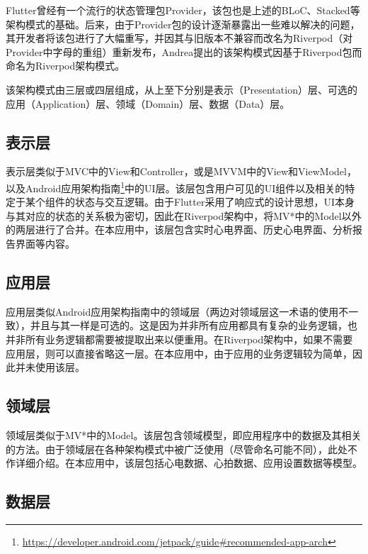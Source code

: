 Flutter曾经有一个流行的状态管理包Provider，该包也是上述的BLoC、Stacked等架构模式的基础。后来，由于Provider包的设计逐渐暴露出一些难以解决的问题，其开发者将该包进行了大幅重写，并因其与旧版本不兼容而改名为Riverpod（对Provider中字母的重组）重新发布，Andrea提出的该架构模式因基于Riverpod包而命名为Riverpod架构模式。

该架构模式由三层或四层组成，从上至下分别是表示（Presentation）层、可选的应用（Application）层、领域（Domain）层、数据（Data）层。

\subsection{表示层}\label{subsec:presentation-layer}

表示层类似于MVC中的View和Controller，或是MVVM中的View和ViewModel，以及Android应用架构指南\footnote{\url{https://developer.android.com/jetpack/guide\#recommended-app-arch}}中的UI层。该层包含用户可见的UI组件以及相关的特定于某个组件的状态与交互逻辑。由于Flutter采用了响应式的设计思想，UI本身与其对应的状态的关系极为密切，因此在Riverpod架构中，将MV*中的Model以外的两层进行了合并。在本应用中，该层包含实时心电界面、历史心电界面、分析报告界面等内容。

\subsection{应用层}\label{subsec:app-layer}

应用层类似Android应用架构指南中的领域层（两边对领域层这一术语的使用不一致），并且与其一样是可选的。这是因为并非所有应用都具有复杂的业务逻辑，也并非所有业务逻辑都需要被提取出来以便重用。在Riverpod架构中，如果不需要应用层，则可以直接省略这一层。在本应用中，由于应用的业务逻辑较为简单，因此并未使用该层。

\subsection{领域层}\label{subsec:domain-layer}

领域层类似于MV*中的Model。该层包含领域模型，即应用程序中的数据及其相关的方法。由于领域层在各种架构模式中被广泛使用（尽管命名可能不同），此处不作详细介绍。在本应用中，该层包括心电数据、心拍数据、应用设置数据等模型。

\subsection{数据层}\label{subsec:data-layer}

